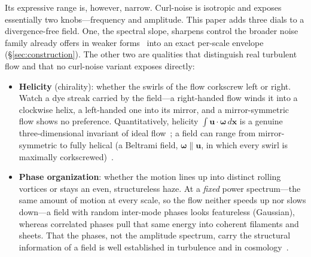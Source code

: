 \documentclass[11pt]{article}
\theoremstyle{remark}
\newcommand{\bx}{\mathbf{x}}
\newcommand{\bu}{\mathbf{u}}
\newcommand{\bomega}{\boldsymbol{\omega}}
\begin{document}
Its expressive range is, however, narrow. Curl-noise is isotropic and exposes essentially two
knobs---frequency and amplitude. This paper adds three dials to a divergence-free field. One,
the spectral slope, sharpens control the broader noise family already offers in weaker
forms~\cite{lagae2010,galerne2012} into an exact per-scale envelope (\S\ref{sec:construction}).
The other two are qualities that distinguish real turbulent flow and that no curl-noise variant
exposes directly:
\begin{itemize}[nosep]
\item \textbf{Helicity} (chirality): whether the swirls of the flow corkscrew left or right.
Watch a dye streak carried by the field---a right-handed flow winds it into a clockwise helix,
a left-handed one into its mirror, and a mirror-symmetric flow shows no preference.
Quantitatively, helicity $\int \bu\cdot\bomega\,d\bx$ is a genuine three-dimensional invariant
of ideal flow~\cite{moffatt1969}; a field can range from mirror-symmetric to fully helical
(a Beltrami field, $\bomega\parallel\bu$, in which every swirl is maximally
corkscrewed)~\cite{constantin1988,dombre1986}.
\item \textbf{Phase organization}: whether the motion lines up into distinct rolling vortices
or stays an even, structureless haze. At a \emph{fixed} power spectrum---the same amount of
motion at every scale, so the flow neither speeds up nor slows down---a field with random
inter-mode phases looks featureless (Gaussian), whereas correlated phases pull that same energy
into coherent filaments and sheets. That the phases, not the amplitude spectrum, carry the
structural information of a field is well established in turbulence and in
cosmology~\cite{coles2000}.
\end{itemize}
\end{document}
